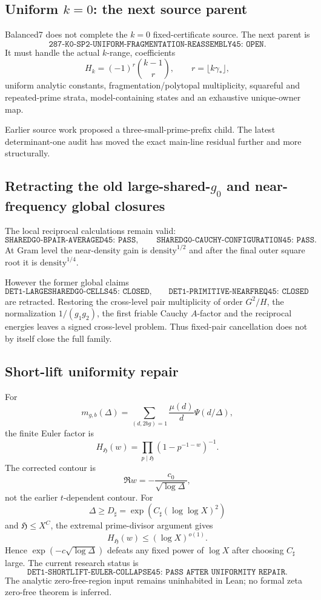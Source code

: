 \documentclass[11pt]{article}
\theoremstyle{definition}
\newcommand{\1}{\mathbf 1}
\begin{document}
\subsection{Uniform $k=0$: the next source parent}

Balanced7 does not complete the $k=0$ fixed-certificate source.  The next parent is
\[
\boxed{\texttt{287-K0-SP2-UNIFORM-FRAGMENTATION-REASSEMBLY45: OPEN}}.
\]
It must handle the actual $k$-range, coefficients
\[
H_k=(-1)^r\binom{k-1}{r},
\qquad r=\lfloor k\gamma_*\rfloor,
\]
uniform analytic constants, fragmentation/polytopal multiplicity, squareful and
repeated-prime strata, model-containing states and an exhaustive unique-owner map.

Earlier source work proposed a three-small-prime-prefix child.  The latest determinant-one
audit has moved the exact main-line residual further and more structurally.

\subsection{Retracting the old large-shared-$g_0$ and near-frequency global closures}

The local reciprocal calculations remain valid:
\[
\texttt{SHAREDG0-BPAIR-AVERAGED45: PASS},
\qquad
\texttt{SHAREDG0-CAUCHY-CONFIGURATION45: PASS}.
\]
At Gram level the near-density gain is $\mathrm{density}^{1/2}$ and after the final outer
square root it is $\mathrm{density}^{1/4}$.

However the former global claims
\[
\texttt{DET1-LARGESHAREDG0-CELLS45: CLOSED},
\qquad
\texttt{DET1-PRIMITIVE-NEARFREQ45: CLOSED}
\]
are retracted.  Restoring the cross-level pair multiplicity of order $G^2/H$, the
normalization $1/(g_1g_2)$, the first friable Cauchy $A$-factor and the reciprocal energies
leaves a signed cross-level problem.  Thus fixed-pair cancellation does not by itself
close the full family.

\subsection{Short-lift uniformity repair}

For
\[
m_{g,b}(\Delta)
=
\sum_{(d,2bg)=1}\frac{\mu(d)}d\Psi(d/\Delta),
\]
the finite Euler factor is
\[
H_{\mathfrak H}(w)
=
\prod_{p\mid\mathfrak H}(1-p^{-1-w})^{-1}.
\]
The corrected contour is
\[
\Re w=-\frac{c_0}{\sqrt{\log\Delta}},
\]
not the earlier $t$-dependent contour.  For
\[
\Delta\ge D_\sharp
=
\exp(C_\sharp(\log\log X)^2)
\]
and $\mathfrak H\le X^C$, the extremal prime-divisor argument gives
\[
H_{\mathfrak H}(w)\le(\log X)^{o(1)}.
\]
Hence $\exp(-c\sqrt{\log\Delta})$ defeats any fixed power of $\log X$ after choosing
$C_\sharp$ large.  The current research status is
\[
\boxed{\texttt{DET1-SHORTLIFT-EULER-COLLAPSE45:
PASS AFTER UNIFORMITY REPAIR}}.
\]
The analytic zero-free-region input remains uninhabited in Lean; no formal zeta
zero-free theorem is inferred.
\end{document}
